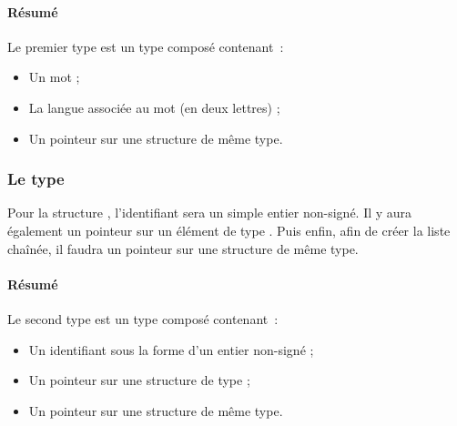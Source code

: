 \documentclass[a4paper]{article}
\begin{document}
				\paragraph{Résumé}
					Le premier type   est un type composé  contenant~:
					\begin{itemize}
						\item Un mot ;
						\item La langue associée au mot (en deux lettres) ;
						\item Un pointeur sur une structure de même type.
					\end{itemize}

			\subsubsection{Le type }
				Pour la structure , l'identifiant sera un simple entier non-signé.
				Il y aura également un pointeur sur un élément de type .
				Puis enfin, afin de créer la liste chaînée, il faudra un pointeur sur une structure de même type.

				\paragraph{Résumé}
					Le second type   est un type composé  contenant~:
					\begin{itemize}
						\item Un identifiant sous la forme d'un entier non-signé ;
						\item Un pointeur sur une structure de type  ;
						\item Un pointeur sur une structure de même type.
					\end{itemize}
\end{document}

